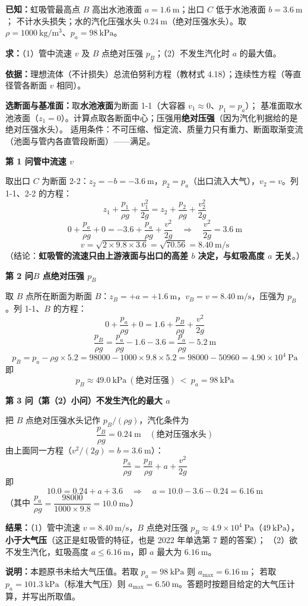 \begin{jie}
\textbf{已知：}虹吸管最高点 $B$ 高出水池液面 $a=1.6\ \mathrm{m}$；出口 $C$ 低于水池液面 $b=3.6\ \mathrm{m}$；
不计水头损失；水的汽化压强水头 $0.24\ \mathrm{m}$（绝对压强水头）。取 $\rho=1000\ \mathrm{kg/m^3}$、$p_a=98\ \mathrm{kPa}$。

\textbf{求：}（1）管中流速 $v$ 及 $B$ 点绝对压强 $p_B$；（2）不发生汽化时 $a$ 的最大值。

\textbf{依据：}理想流体（不计损失）总流伯努利方程（教材式 4.18）；连续性方程（等直径管各断面 $v$ 相同）。

\textbf{选断面与基准面：}取\textbf{水池液面}为断面 1-1（大容器 $v_1\approx0$、$p_1=p_a$）；
基准面取水池液面（$z_1=0$）。计算点取各断面中心；压强用\textbf{绝对压强}（因为汽化判据给的是绝对压强水头）。
适用条件：不可压缩、恒定流、质量力只有重力、断面取渐变流（池面与管内各直管段断面）——满足。

\textbf{第 1 问\quad 管中流速 $v$}

取出口 $C$ 为断面 2-2：$z_2=-b=-3.6\ \mathrm{m}$，$p_2=p_a$（出口流入大气），$v_2=v$。列 1-1、2-2 的方程：
\[ z_1+\frac{p_1}{\rho g}+\frac{v_1^2}{2g}=z_2+\frac{p_2}{\rho g}+\frac{v_2^2}{2g} \]
\[ 0+\frac{p_a}{\rho g}+0=-3.6+\frac{p_a}{\rho g}+\frac{v^2}{2g}
   \quad\Longrightarrow\quad \frac{v^2}{2g}=3.6\ \mathrm{m} \]
\[ v=\sqrt{2\times9.8\times3.6}=\sqrt{70.56}=8.40\ \mathrm{m/s} \]
（结论：\textbf{虹吸管的流速只由上游液面与出口的高差 $b$ 决定，与虹吸高度 $a$ 无关}。）

\textbf{第 2 问\quad $B$ 点绝对压强 $p_B$}

取 $B$ 点所在断面为断面 $B$：$z_B=+a=+1.6\ \mathrm{m}$，$v_B=v=8.40\ \mathrm{m/s}$，压强为 $p_B$。列 1-1、$B$ 的方程：
\[ 0+\frac{p_a}{\rho g}+0=1.6+\frac{p_B}{\rho g}+\frac{v^2}{2g} \]
\[ \frac{p_B}{\rho g}=\frac{p_a}{\rho g}-1.6-3.6=\frac{p_a}{\rho g}-5.2\ \mathrm{m} \]
\[ p_B=p_a-\rho g\times5.2=98000-1000\times9.8\times5.2=98000-50960=4.90\times10^4\ \mathrm{Pa} \]
即
\[ p_B\approx49.0\ \mathrm{kPa}\ (\text{绝对压强})\ <\ p_a=98\ \mathrm{kPa} \]

\textbf{第 3 问（第（2）小问）\quad 不发生汽化的最大 $a$}

把 $B$ 点绝对压强水头记作 $p_B/(\rho g)$，汽化条件为
\[ \frac{p_B}{\rho g}=0.24\ \mathrm{m}\quad(\text{绝对压强水头}) \]
由上面同一方程（$v^2/(2g)=b=3.6\ \mathrm{m}$）：
\[ \frac{p_a}{\rho g}=\frac{p_B}{\rho g}+a+\frac{v^2}{2g} \]
即
\[ 10.0=0.24+a+3.6\quad\Longrightarrow\quad a=10.0-3.6-0.24=6.16\ \mathrm{m} \]
（其中 $\dfrac{p_a}{\rho g}=\dfrac{98000}{1000\times9.8}=10.0\ \mathrm{m}$。）

\textbf{结果：}（1）管中流速 $v=8.40\ \mathrm{m/s}$，$B$ 点绝对压强 $p_B\approx4.9\times10^4\ \mathrm{Pa}$（$49\ \mathrm{kPa}$），
\textbf{小于大气压}（这正是虹吸管的特征，也是 2022 年单选第 7 题的答案）；
（2）欲不发生汽化，虹吸高度 $a\le6.16\ \mathrm{m}$，即 $a$ 最大为 $6.16\ \mathrm{m}$。

\textbf{说明：}本题原书未给大气压值。若取 $p_a=98\ \mathrm{kPa}$ 则 $a_{\max}=6.16\ \mathrm{m}$；
若取 $p_a=101.3\ \mathrm{kPa}$（标准大气压）则 $a_{\max}=6.50\ \mathrm{m}$。答题时按题目给定的大气压计算，并写出所取值。
\end{jie}

